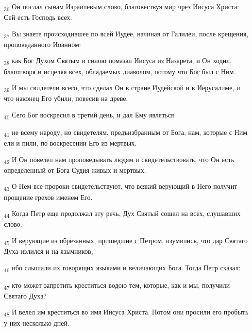 \begin{tcolorbox}
\textsubscript{36} Он послал сынам Израилевым слово, благовествуя мир чрез Иисуса Христа; Сей есть Господь всех.
\end{tcolorbox}
\begin{tcolorbox}
\textsubscript{37} Вы знаете происходившее по всей Иудее, начиная от Галилеи, после крещения, проповеданного Иоанном:
\end{tcolorbox}
\begin{tcolorbox}
\textsubscript{38} как Бог Духом Святым и силою помазал Иисуса из Назарета, и Он ходил, благотворя и исцеляя всех, обладаемых диаволом, потому что Бог был с Ним.
\end{tcolorbox}
\begin{tcolorbox}
\textsubscript{39} И мы свидетели всего, что сделал Он в стране Иудейской и в Иерусалиме, и что наконец Его убили, повесив на древе.
\end{tcolorbox}
\begin{tcolorbox}
\textsubscript{40} Сего Бог воскресил в третий день, и дал Ему являться
\end{tcolorbox}
\begin{tcolorbox}
\textsubscript{41} не всему народу, но свидетелям, предъизбранным от Бога, нам, которые с Ним ели и пили, по воскресении Его из мертвых.
\end{tcolorbox}
\begin{tcolorbox}
\textsubscript{42} И Он повелел нам проповедывать людям и свидетельствовать, что Он есть определенный от Бога Судия живых и мертвых.
\end{tcolorbox}
\begin{tcolorbox}
\textsubscript{43} О Нем все пророки свидетельствуют, что всякий верующий в Него получит прощение грехов именем Его.
\end{tcolorbox}
\begin{tcolorbox}
\textsubscript{44} Когда Петр еще продолжал эту речь, Дух Святый сошел на всех, слушавших слово.
\end{tcolorbox}
\begin{tcolorbox}
\textsubscript{45} И верующие из обрезанных, пришедшие с Петром, изумились, что дар Святаго Духа излился и на язычников,
\end{tcolorbox}
\begin{tcolorbox}
\textsubscript{46} ибо слышали их говорящих языками и величающих Бога. Тогда Петр сказал:
\end{tcolorbox}
\begin{tcolorbox}
\textsubscript{47} кто может запретить креститься водою тем, которые, как и мы, получили Святаго Духа?
\end{tcolorbox}
\begin{tcolorbox}
\textsubscript{48} И велел им креститься во имя Иисуса Христа. Потом они просили его пробыть у них несколько дней.
\end{tcolorbox}
